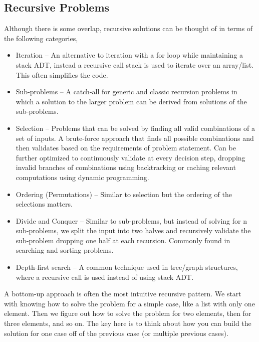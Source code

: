 \documentclass{article}
\begin{document}
    \subsection{Recursive Problems}
    Although there is some overlap, recursive solutions can be thought of in terms of the following categories,
    \begin{itemize}
        \item Iteration -- An alternative to iteration with a for loop while maintaining a stack ADT, instead a recursive call stack is used to iterate over an array/list. This often simplifies the code. 
        \item Sub-problems -- A catch-all for generic and classic recursion problems in which a solution to the larger problem can be derived from solutions of the sub-problems.
        
        \item Selection -- Problems that can be solved by finding all valid combinations of a set of inputs. A brute-force approach that finds all possible combinations and then validates based on the requirements of problem statement. Can be further optimized to continuously validate at every decision step, dropping invalid branches of combinations using backtracking or caching relevant computations using dynamic programming.
        
        \item Ordering (Permutations) -- Similar to selection but the ordering of the selections matters.  
        
        \item Divide and Conquer -- Similar to sub-problems, but instead of solving for n sub-problems, we split the input into two halves and recursively validate the sub-problem dropping one half at each recursion. Commonly found in searching and sorting problems.
        
        \item Depth-first search --  A common technique used in tree/graph structures, where a recursive call is used instead of using stack ADT.
    \end{itemize}
    
    A bottom-up approach is often the most intuitive recursive pattern. We start with knowing how to solve the problem for a simple case, like a list with only one element. Then we figure out how to solve the problem for two elements, then for three elements, and so on. The key here is to think about how you can build the solution for one case off of the previous case (or multiple previous cases). 
    
\end{document}
